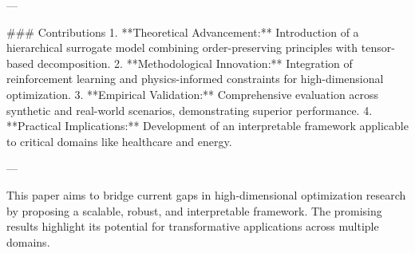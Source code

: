 ---

### Contributions  
1. **Theoretical Advancement:** Introduction of a hierarchical surrogate model combining order-preserving principles with tensor-based decomposition.  
2. **Methodological Innovation:** Integration of reinforcement learning and physics-informed constraints for high-dimensional optimization.  
3. **Empirical Validation:** Comprehensive evaluation across synthetic and real-world scenarios, demonstrating superior performance.  
4. **Practical Implications:** Development of an interpretable framework applicable to critical domains like healthcare and energy.  

---

This paper aims to bridge current gaps in high-dimensional optimization research by proposing a scalable, robust, and interpretable framework. The promising results highlight its potential for transformative applications across multiple domains.